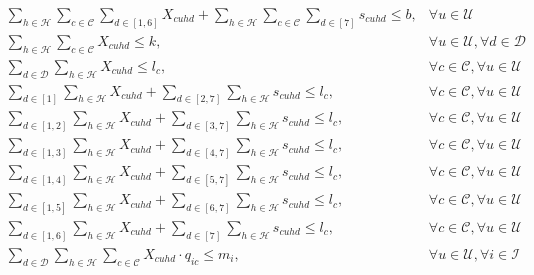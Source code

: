 \documentclass[11pt]{article}
\begin{document}
\begin{align}
&\sum\limits_{h\in\mathcal{H}}\sum\limits_{c\in\mathcal{C}}\sum\limits_{d\in [1,6]}X_{{c}{u}{h}{d}} + \sum\limits_{h\in\mathcal{H}}\sum\limits_{c\in\mathcal{C}}\sum\limits_{d\in [7]}s_{{c}{u}{h}{d}} \leq b, &\forall u \in \mathcal{U} \label{mathmodel_percustomercommlimit_rh6}&\\
&\sum\limits_{h\in\mathcal{H}}\sum\limits_{c\in\mathcal{C}}X_{{c}{u}{h}{d}} \leq k, &\forall u \in \mathcal{U}, \forall d \in \mathcal{D} \label{mathmodel_percustomercommlimit_day}&\\
&\sum\limits_{d\in\mathcal{D}}\sum\limits_{h\in\mathcal{H}}X_{{c}{u}{h}{d}} \leq l_{c}, &\forall c \in \mathcal{C}, \forall u \in \mathcal{U} \label{mathmodel_percustomercamplimit}&\\
&\sum\limits_{d\in[1]}\sum\limits_{h\in\mathcal{H}}X_{{c}{u}{h}{d}} + \sum\limits_{d\in[2,7]}\sum\limits_{h\in\mathcal{H}}s_{{c}{u}{h}{d}} \leq l_{c}, &\forall c \in \mathcal{C}, \forall u \in \mathcal{U} \label{mathmodel_percustomercamplimit_rh1}&\\
&\sum\limits_{d\in[1,2]}\sum\limits_{h\in\mathcal{H}}X_{{c}{u}{h}{d}} + \sum\limits_{d\in[3,7]}\sum\limits_{h\in\mathcal{H}}s_{{c}{u}{h}{d}} \leq l_{c}, &\forall c \in \mathcal{C}, \forall u \in \mathcal{U} \label{mathmodel_percustomercamplimit_rh2}&\\
&\sum\limits_{d\in[1,3]}\sum\limits_{h\in\mathcal{H}}X_{{c}{u}{h}{d}} + \sum\limits_{d\in[4,7]}\sum\limits_{h\in\mathcal{H}}s_{{c}{u}{h}{d}} \leq l_{c}, &\forall c \in \mathcal{C}, \forall u \in \mathcal{U} \label{mathmodel_percustomercamplimit_rh3}&\\
&\sum\limits_{d\in[1,4]}\sum\limits_{h\in\mathcal{H}}X_{{c}{u}{h}{d}} + \sum\limits_{d\in[5,7]}\sum\limits_{h\in\mathcal{H}}s_{{c}{u}{h}{d}} \leq l_{c}, &\forall c \in \mathcal{C}, \forall u \in \mathcal{U} \label{mathmodel_percustomercamplimit_rh4}&\\
&\sum\limits_{d\in[1,5]}\sum\limits_{h\in\mathcal{H}}X_{{c}{u}{h}{d}} + \sum\limits_{d\in[6,7]}\sum\limits_{h\in\mathcal{H}}s_{{c}{u}{h}{d}} \leq l_{c}, &\forall c \in \mathcal{C}, \forall u \in \mathcal{U} \label{mathmodel_percustomercamplimit_rh5}&\\
&\sum\limits_{d\in[1,6]}\sum\limits_{h\in\mathcal{H}}X_{{c}{u}{h}{d}} + \sum\limits_{d\in[7]}\sum\limits_{h\in\mathcal{H}}s_{{c}{u}{h}{d}} \leq l_{c}, &\forall c \in \mathcal{C}, \forall u \in \mathcal{U} \label{mathmodel_percustomercamplimit_rh6}&\\
&\sum\limits_{d\in\mathcal{D}}\sum\limits_{h\in\mathcal{H}}\sum\limits_{c\in\mathcal{C}}X_{{c}{u}{h}{d}} \cdot q_{{i}{c}} \leq m_{i}, &\forall u \in \mathcal{U}, \forall i \in \mathcal{I} \label{mathmodel_weeklyquotalimit}&\\

\end{align}
\end{document}
